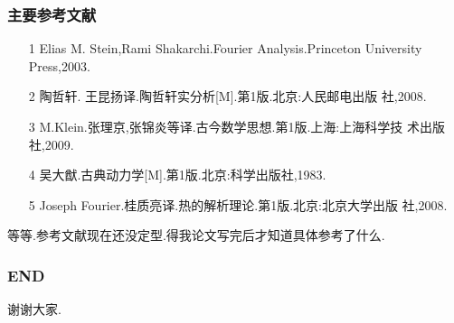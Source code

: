\documentclass{beamer}
\begin{document}
\begin{frame}
  \frametitle{主要参考文献}
  \begin{itemize}
\item [1] Elias M. Stein,Rami Shakarchi.Fourier Analysis.Princeton University Press,2003.
  \item [2] 陶哲轩. 王昆扬译.陶哲轩实分析[M].第1版.北京:人民邮电出版
    社,2008.
\item [3]M.Klein.张理京,张锦炎等译.古今数学思想.第1版.上海:上海科学技
  术出版社,2009.
\item [4]吴大猷.古典动力学[M].第1版.北京:科学出版社,1983.
\item [5]Joseph Fourier.桂质亮译.热的解析理论.第1版.北京:北京大学出版
  社,2008.
  \end{itemize}
等等.参考文献现在还没定型.得我论文写完后才知道具体参考了什么.
\end{frame}
\begin{frame}
  \frametitle{END}
\begin{center}
谢谢大家.
\end{center}
\end{frame}
\end{document}
